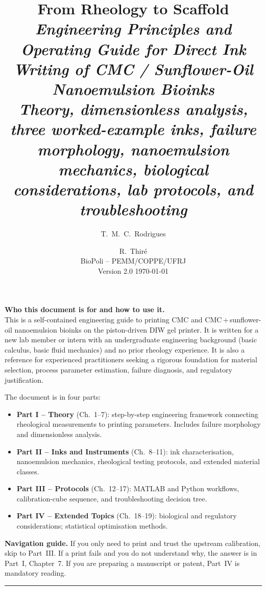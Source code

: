 \documentclass[11pt,a4paper]{article}
\title{\textbf{From Rheology to Scaffold}\\[4pt]
\large \textsl{Engineering Principles and Operating Guide for Direct
Ink Writing of CMC / Sunflower-Oil Nanoemulsion Bioinks}\\[4pt]
\normalsize \textsl{Theory, dimensionless analysis, three worked-example inks,
failure morphology, nanoemulsion mechanics, biological considerations,
lab protocols, and troubleshooting}}
\author{T.~M.~C.~Rodrigues \and R.~Thir\'e \\[2pt]
\small BioPoli -- PEMM/COPPE/UFRJ \\[2pt]
\small Version 2.0 \quad \today}
\date{}
\begin{document}
\maketitle
\thispagestyle{fancy}

\begin{tcolorbox}[colback=blue!3!white,colframe=blue!50!black,
                  arc=2mm,boxrule=0.4pt,left=8pt,right=8pt]
\textbf{Who this document is for and how to use it.}\\
This is a self-contained engineering guide to printing CMC and
CMC\,+\,sunflower-oil nanoemulsion bioinks on the piston-driven DIW gel
printer. It is written for a new lab member or intern with an
undergraduate engineering background (basic calculus, basic fluid
mechanics) and no prior rheology experience. It is also a reference for
experienced practitioners seeking a rigorous foundation for material
selection, process parameter estimation, failure diagnosis, and regulatory
justification.

\medskip
The document is in four parts:
\begin{itemize}[leftmargin=1.4em,itemsep=2pt]
\item \textbf{Part I -- Theory} (Ch.~1--7): step-by-step engineering
framework connecting rheological measurements to printing parameters.
Includes failure morphology and dimensionless analysis.
\item \textbf{Part II -- Inks and Instruments} (Ch.~8--11): ink
characterisation, nanoemulsion mechanics, rheological testing protocols,
and extended material classes.
\item \textbf{Part III -- Protocols} (Ch.~12--17): MATLAB and Python
workflows, calibration-cube sequence, and troubleshooting decision tree.
\item \textbf{Part IV -- Extended Topics} (Ch.~18--19): biological and
regulatory considerations; statistical optimisation methods.
\end{itemize}

\medskip
\textbf{Navigation guide.} If you only need to print and trust the
upstream calibration, skip to Part~III. If a print fails and you do not
understand why, the answer is in Part~I, Chapter~7. If you are preparing
a manuscript or patent, Part~IV is mandatory reading.
\end{tcolorbox}

\tableofcontents
\bigskip\hrule\bigskip

\end{document}
